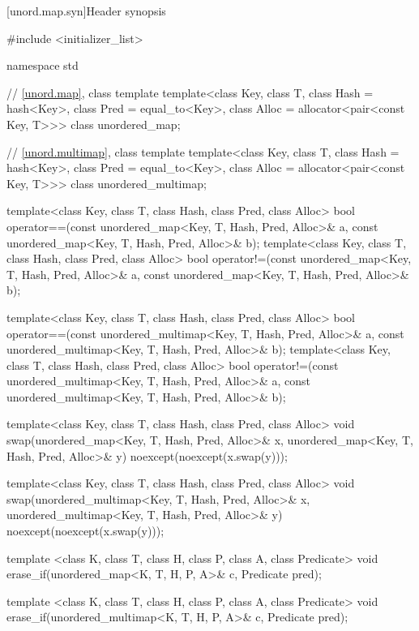 [unord.map.syn]{Header  synopsis}%
%
%
%
\begin{codeblock}
#include <initializer_list>

namespace std {
  // \ref{unord.map}, class template 
  template<class Key,
           class T,
           class Hash = hash<Key>,
           class Pred = equal_to<Key>,
           class Alloc = allocator<pair<const Key, T>>>
    class unordered_map;

  // \ref{unord.multimap}, class template 
  template<class Key,
           class T,
           class Hash = hash<Key>,
           class Pred = equal_to<Key>,
           class Alloc = allocator<pair<const Key, T>>>
    class unordered_multimap;

  template<class Key, class T, class Hash, class Pred, class Alloc>
    bool operator==(const unordered_map<Key, T, Hash, Pred, Alloc>& a,
                    const unordered_map<Key, T, Hash, Pred, Alloc>& b);
  template<class Key, class T, class Hash, class Pred, class Alloc>
    bool operator!=(const unordered_map<Key, T, Hash, Pred, Alloc>& a,
                    const unordered_map<Key, T, Hash, Pred, Alloc>& b);

  template<class Key, class T, class Hash, class Pred, class Alloc>
    bool operator==(const unordered_multimap<Key, T, Hash, Pred, Alloc>& a,
                    const unordered_multimap<Key, T, Hash, Pred, Alloc>& b);
  template<class Key, class T, class Hash, class Pred, class Alloc>
    bool operator!=(const unordered_multimap<Key, T, Hash, Pred, Alloc>& a,
                    const unordered_multimap<Key, T, Hash, Pred, Alloc>& b);

  template<class Key, class T, class Hash, class Pred, class Alloc>
    void swap(unordered_map<Key, T, Hash, Pred, Alloc>& x,
              unordered_map<Key, T, Hash, Pred, Alloc>& y)
      noexcept(noexcept(x.swap(y)));

  template<class Key, class T, class Hash, class Pred, class Alloc>
    void swap(unordered_multimap<Key, T, Hash, Pred, Alloc>& x,
              unordered_multimap<Key, T, Hash, Pred, Alloc>& y)
      noexcept(noexcept(x.swap(y)));

  template <class K, class T, class H, class P, class A, class Predicate>
    void erase_if(unordered_map<K, T, H, P, A>& c, Predicate pred);

  template <class K, class T, class H, class P, class A, class Predicate>
    void erase_if(unordered_multimap<K, T, H, P, A>& c, Predicate pred);

}
\end{codeblock}

